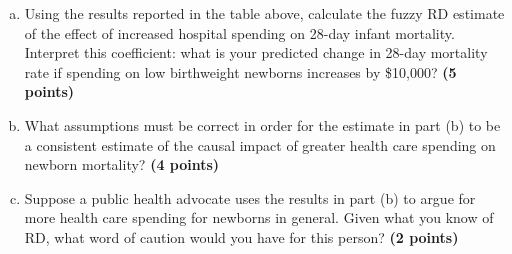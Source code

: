 \documentclass[12pt]{article}
\begin{document}
\begin{enumerate}[(a)]
\setlength\itemsep{1em}
\item Using the results reported in the table above, calculate the fuzzy RD estimate of the effect of increased hospital spending on 28-day infant mortality. Interpret this coefficient: what is your predicted change in 28-day mortality rate if spending on low birthweight newborns increases by \$10,000? \textbf{(5 points)}

\item What assumptions must be correct in order for the estimate in part (b) to be a consistent estimate of the causal impact of greater health care spending on newborn mortality? \textbf{(4 points)}

\item Suppose a public health advocate uses the results in part (b) to argue for more health care spending for newborns in general. Given what you know of RD, what word of caution would you have for this person? \textbf{(2 points)}
\end{enumerate}


\end{document}

